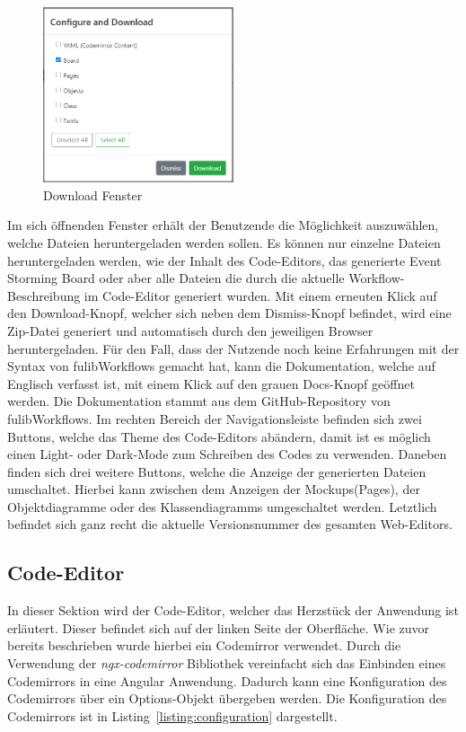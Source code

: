 \begin{figure}[h]
    \centering
    \includegraphics[width=0.5\textwidth]{images/3.2/download}
    \caption{Download Fenster}
    \label{fig:download}
\end{figure}

Im sich öffnenden Fenster erhält der Benutzende die Möglichkeit auszuwählen, welche Dateien heruntergeladen werden sollen.
Es können nur einzelne Dateien heruntergeladen werden, wie der Inhalt des Code-Editors, das generierte Event Storming Board oder aber alle Dateien
die durch die aktuelle Workflow-Beschreibung im Code-Editor generiert wurden.
Mit einem erneuten Klick auf den Download-Knopf, welcher sich neben dem Dismiss-Knopf befindet, wird eine Zip-Datei generiert und automatisch durch den jeweiligen Browser heruntergeladen.
Für den Fall, dass der Nutzende noch keine Erfahrungen mit der Syntax von fulibWorkflows gemacht hat, kann die Dokumentation, welche auf Englisch verfasst ist, mit einem Klick
auf den grauen Docs-Knopf geöffnet werden.
Die Dokumentation stammt aus dem GitHub-Repository von fulibWorkflows.
Im rechten Bereich der Navigationsleiste befinden sich zwei Buttons, welche das Theme des Code-Editors abändern, damit ist es möglich einen Light- oder Dark-Mode zum Schreiben
des Codes zu verwenden.
Daneben finden sich drei weitere Buttons, welche die Anzeige der generierten Dateien umschaltet.
Hierbei kann zwischen dem Anzeigen der Mockups(Pages), der Objektdiagramme oder des Klassendiagramms umgeschaltet werden.
Letztlich befindet sich ganz recht die aktuelle Versionsnummer des gesamten Web-Editors.

\subsection{Code-Editor}\label{subsec:codeeditor}
In dieser Sektion wird der Code-Editor, welcher das Herzstück der Anwendung ist erläutert.
Dieser befindet sich auf der linken Seite der Oberfläche.
Wie zuvor bereits beschrieben wurde hierbei ein Codemirror verwendet.
Durch die Verwendung der \textit{ngx-codemirror} Bibliothek vereinfacht sich das Einbinden eines Codemirrors in eine Angular Anwendung.
Dadurch kann eine Konfiguration des Codemirrors über ein Options-Objekt übergeben werden.
Die Konfiguration des Codemirrors ist in Listing~\ref{listing:configuration} dargestellt.

